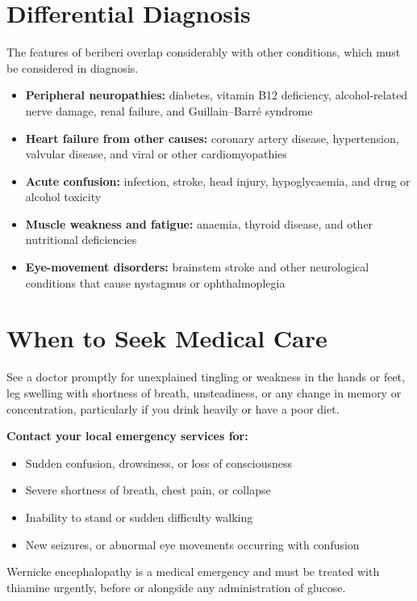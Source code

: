 \section*{Differential Diagnosis}
The features of beriberi overlap considerably with other conditions, which must be considered in diagnosis.

\begin{itemize}
    \item \textbf{Peripheral neuropathies:} diabetes, vitamin B12 deficiency, alcohol-related nerve damage, renal failure, and Guillain--Barr\'e syndrome
    \item \textbf{Heart failure from other causes:} coronary artery disease, hypertension, valvular disease, and viral or other cardiomyopathies
    \item \textbf{Acute confusion:} infection, stroke, head injury, hypoglycaemia, and drug or alcohol toxicity
    \item \textbf{Muscle weakness and fatigue:} anaemia, thyroid disease, and other nutritional deficiencies
    \item \textbf{Eye-movement disorders:} brainstem stroke and other neurological conditions that cause nystagmus or ophthalmoplegia
\end{itemize}

\section*{When to Seek Medical Care}
See a doctor promptly for unexplained tingling or weakness in the hands or feet, leg swelling with shortness of breath, unsteadiness, or any change in memory or concentration, particularly if you drink heavily or have a poor diet.

\textbf{Contact your local emergency services for:}
\begin{itemize}
    \item Sudden confusion, drowsiness, or loss of consciousness
    \item Severe shortness of breath, chest pain, or collapse
    \item Inability to stand or sudden difficulty walking
    \item New seizures, or abnormal eye movements occurring with confusion
\end{itemize}

Wernicke encephalopathy is a medical emergency and must be treated with thiamine urgently, before or alongside any administration of glucose.

